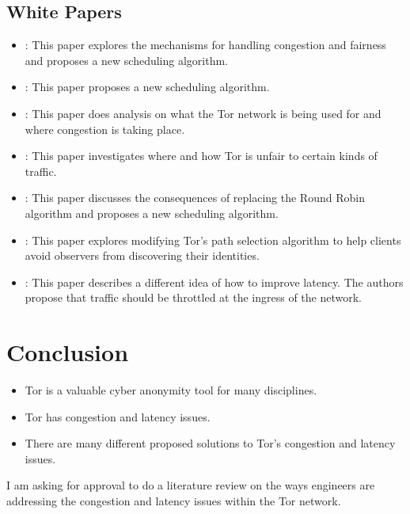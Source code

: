 \documentclass[letterpaper,13pt]{texMemo}
\begin{document}
\subsection*{White Papers}
\begin{itemize}
    \item
    \citeauthor*{unfair}: This paper explores the mechanisms for handling congestion
    and fairness and proposes a new scheduling algorithm.
    \item
    \citeauthor*{Tang}: This paper proposes a new scheduling algorithm.
    \item
    \citeauthor*{analysis}: This paper does analysis on what the Tor network is being used for and where congestion is taking place.
    \item
    \citeauthor*{delay}: This paper investigates where and how Tor is unfair to certain kinds of traffic.
    \item
    \citeauthor*{Bauer}: This paper discusses the consequences of replacing the Round Robin algorithm and
    proposes a new scheduling algorithm.
    \item
    \citeauthor*{Edman}: This paper explores modifying Tor's path selection algorithm to help
    clients avoid observers from discovering their identities.
    \item
    \citeauthor*{Moore}: This paper describes a different idea of how to improve latency. The
    authors propose that traffic should be throttled at the ingress of the network.

\end{itemize}


\section*{Conclusion}
\begin{itemize}
    \item
    Tor is a valuable cyber anonymity tool for many disciplines.
    \item
    Tor has congestion and latency issues.
    \item
    There are many different proposed solutions to Tor's congestion and latency issues.
\end{itemize}
I am asking for approval to do a literature review on the ways engineers are addressing the
congestion and latency issues within the Tor network.


%

\end{document}
